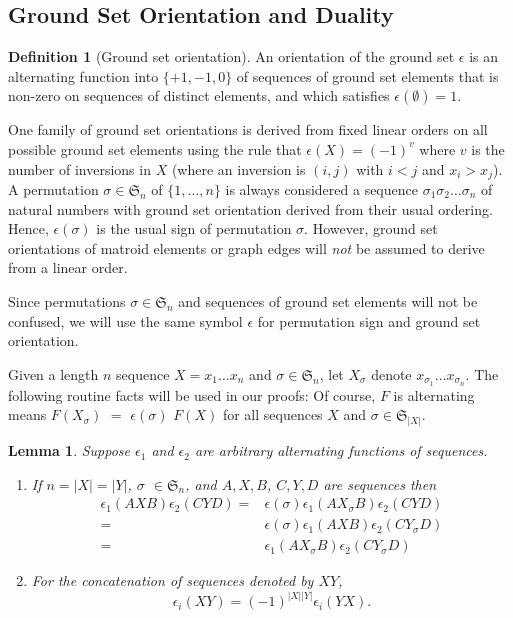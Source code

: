 \documentclass[12pt]{article}
\newtheorem{lemma}[theorem]{Lemma}
\theoremstyle{definition}
\newtheorem{definition}[theorem]{Definition}
\newcommand{\Perms}{\ensuremath{\mathfrak{S}}}
\newcommand{\Card}[1]{\ensuremath{{\left|#1\right|}}}
\begin{document}
\subsection{Ground Set Orientation and Duality}

\begin{definition}[Ground set orientation]
An orientation of the ground set $\epsilon$ is an alternating function
into $\{+1, -1, 0\}$ of sequences of ground set elements that is 
non-zero on sequences of distinct elements, and which satisfies
$\epsilon(\emptyset)=1$.
\end{definition}

One family of ground set orientations is derived from fixed linear
orders on all possible ground set elements using the rule that
$\epsilon(X)=(-1)^v$ where $v$ is the number of inversions in $X$
(where an inversion is $(i,j)$ with $i<j$ and $x_i>x_j$).  A permutation 
$\sigma\in\Perms_n$ of $\{1,\ldots,n\}$ is always considered a sequence
$\sigma_1\sigma_2\ldots\sigma_n$ of natural numbers 
with ground set orientation derived from their usual ordering.
Hence, $\epsilon(\sigma)$ is the usual sign of permutation $\sigma$.
However, ground set orientations of matroid elements or graph edges
will \emph{not} be assumed to derive from a linear order. 

Since permutations $\sigma\in\Perms_n$ and sequences of ground set
elements will not be confused, we will use the same symbol $\epsilon$
for permutation sign and ground set orientation.

Given a length $n$ sequence $X=x_1\ldots x_n$ and $\sigma\in\Perms_n$,
let $X_\sigma$ denote $x_{\sigma_1}\ldots x_{\sigma_n}$.
The following routine facts will be used in our proofs:  Of course,
$F$ is alternating means $F(X_\sigma)$ $=$ $\epsilon(\sigma)$
$F(X)$ for all sequences $X$ and $\sigma\in\Perms_{\Card{X}}$.
\begin{lemma}%
\label{lemmaEpsilonFacts}
Suppose $\epsilon_1$ and $\epsilon_2$ are arbitrary alternating 
functions of sequences.
\begin{enumerate}
\item If $n=|X|=|Y|$, $\sigma$ $\in \Perms_n$,
and $A, X, B$, $C, Y, D$ are sequences then
\begin{eqnarray*}
\epsilon_1(AXB)\epsilon_2(CYD)=&
\epsilon(\sigma)\epsilon_1(AX_\sigma B)\epsilon_2(CYD) \\
                              =&
\epsilon(\sigma)\epsilon_1(AXB)\epsilon_2(CY_\sigma D) \\
                              =&
\epsilon_1(AX_\sigma B)\epsilon_2(CY_\sigma D)
\end{eqnarray*}

\item 
For the concatenation of sequences denoted by $XY$,
\[
\epsilon_i(XY) =
(-1)^{|X||Y|}\epsilon_i(YX).
\]
\end{enumerate}
\end{lemma}
\end{document}
